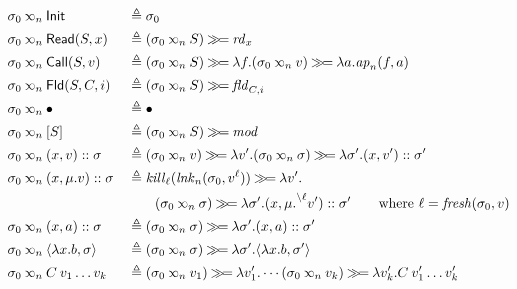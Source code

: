 \begin{alignat*}{2}
  \sigma_0\lk{n}{} & \InitE                              &  & \triangleq\sigma_0                                                                                          \\
  \sigma_0\lk{n}{} & \ReadE(S,x)                         &  & \triangleq(\sigma_0\lk{n}S)\bindt\rdf{x}                                                                     \\
  \sigma_0\lk{n}{} & \CallE(S,v)                         &  & \triangleq(\sigma_0\lk{n}S)\bindt\lambda f.(\sigma_0\lk{n}v)\bindt\lambda a.\apf{n}(f,a)                     \\
  \sigma_0\lk{n}{} & \FldE(S,C,i)                        &  & \triangleq(\sigma_0\lk{n}S)\bindt\fldf{C}{i}                                                                 \\
  \sigma_0\lk{n}{} & \bullet                             &  & \triangleq\bullet                                                                                            \\
  \sigma_0\lk{n}{} & [S]                                 &  & \triangleq(\sigma_0\lk{n}S)\bindt\modf                                                                       \\
  \sigma_0\lk{n}{} & (x,v)\cons\sigma                    &  & \triangleq(\sigma_0\lk{n}v)\bindt\lambda v'.(\sigma_0\lk{n}\sigma)\bindt\lambda\sigma'.(x,v')\cons\sigma'    \\
  \sigma_0\lk{n}{} & (x,\muval{v})\cons\sigma            &  & \triangleq\killf{\ell}(\lnkv{n}(\sigma_0,\openloc{\ell}{v}))\bindt\lambda v'.                              \\
                   &                                     &  & \qquad(\sigma_0\lk{n}\sigma)\bindt\lambda\sigma'.(x,\muval{\closeloc{\ell}{v'}})\cons\sigma'
                   \qquad\text{where }\ell=\fresh(\sigma_0,v)                                                                    \\
  \sigma_0\lk{n}{} & (x,a)\cons\sigma                    &  & \triangleq(\sigma_0\lk{n}\sigma)\bindt\lambda\sigma'.(x,a)\cons\sigma'                                        \\
  \sigma_0\lk{n}{} & \langle\lambda x.b,\sigma\rangle    &  & \triangleq(\sigma_0\lk{n}\sigma)\bindt\lambda\sigma'.\langle\lambda x.b,\sigma'\rangle                        \\
  \sigma_0\lk{n}{} & C\:v_1\dots v_k                     &  & \triangleq(\sigma_0\lk{n}v_1)\bindt\lambda v_1'.\cdots(\sigma_0\lk{n}v_k)\bindt\lambda v_k'.C\:v_1'\dots v_k'
\end{alignat*}

